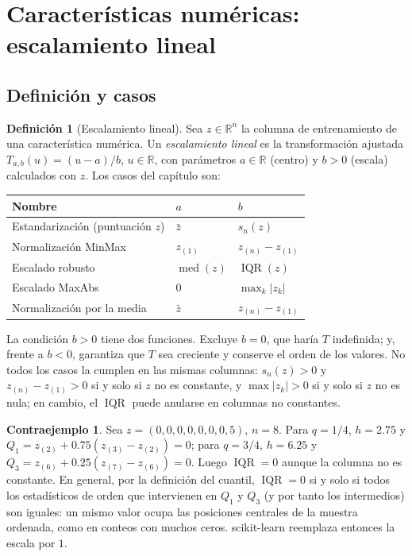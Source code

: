\documentclass[11pt,a4paper]{article}
\theoremstyle{plain}
\theoremstyle{definition}
\newtheorem{definicion}[teorema]{Definición}
\newtheorem{contraejemplo}[teorema]{Contraejemplo}
\theoremstyle{remark}
\newcommand{\R}{\mathbb{R}}
\newcommand{\med}{\operatorname{med}}
\newcommand{\IQR}{\operatorname{IQR}}
\newcommand{\1}{\mathbf{1}}
\begin{document}
\section{Características numéricas: escalamiento lineal}

\subsection{Definición y casos}

\begin{definicion}[Escalamiento lineal]\label{def:escala}
Sea $z\in\R^n$ la columna de entrenamiento de una característica
numérica. Un \emph{escalamiento lineal} es la transformación ajustada
$T_{a,b}(u)=(u-a)/b$, $u\in\R$, con parámetros $a\in\R$ (centro) y $b>0$
(escala) calculados con $z$. Los casos del capítulo son:
\begin{center}
\begin{tabular}{@{}lll@{}}
\toprule
Nombre & $a$ & $b$\\
\midrule
Estandarización (puntuación $z$) & $\bar z$ & $s_n(z)$\\
Normalización MinMax & $z_{(1)}$ & $z_{(n)}-z_{(1)}$\\
Escalado robusto & $\med(z)$ & $\IQR(z)$\\
Escalado MaxAbs & $0$ & $\max_k|z_k|$\\
Normalización por la media & $\bar z$ & $z_{(n)}-z_{(1)}$\\
\bottomrule
\end{tabular}
\end{center}
\end{definicion}

La condición $b>0$ tiene dos funciones. Excluye $b=0$, que haría $T$
indefinida; y, frente a $b<0$, garantiza que $T$ sea creciente y conserve
el orden de los valores. No todos los casos la cumplen en las mismas
columnas: $s_n(z)>0$ y $z_{(n)}-z_{(1)}>0$ si y solo si $z$ no es
constante, y $\max|z_k|>0$ si y solo si $z$ no es nula; en cambio, el
$\IQR$ puede anularse en columnas no constantes.

\begin{contraejemplo}
Sea $z=(0,0,0,0,0,0,0,5)$, $n=8$. Para $q=1/4$, $h=2.75$ y
$Q_1=z_{(2)}+0.75(z_{(3)}-z_{(2)})=0$; para $q=3/4$, $h=6.25$ y
$Q_3=z_{(6)}+0.25(z_{(7)}-z_{(6)})=0$. Luego $\IQR=0$ aunque la columna
no es constante. En general, por la definición del cuantil, $\IQR=0$ si
y solo si todos los estadísticos de orden que intervienen en $Q_1$ y
$Q_3$ (y por tanto los intermedios) son iguales: un mismo valor ocupa las
posiciones centrales de la muestra ordenada, como en conteos con muchos
ceros. scikit-learn reemplaza entonces la escala por $1$.
\end{contraejemplo}
\end{document}
